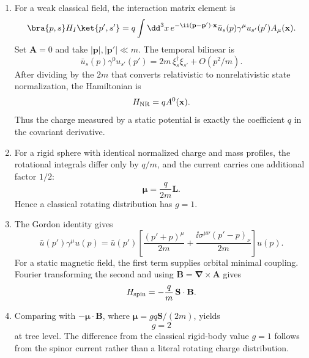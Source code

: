 \begin{enumerate}
\begin{enumerate}
\item
For a weak classical field, the interaction matrix element is
\[
 \bra{p,s}H_I\ket{p',s'}
 =q\int \dd^3x\,e^{-\ii(\mathbf p-\mathbf p')\cdot\mathbf x}
 \bar u_s(p)\gamma^\mu u_{s'}(p')A_\mu(\mathbf x).
\]
Set \(\mathbf A=0\) and take \(|\mathbf p|,|\mathbf p'|\ll m\).
The temporal bilinear is
\[
 \bar u_s(p)\gamma^0u_{s'}(p')
 =2m\,\xi_s^\dagger\xi_{s'}+O(p^2/m).
\]
After dividing by the \(2m\) that converts relativistic to
nonrelativistic state normalization, the Hamiltonian is
\[
 H_{\rm NR}=qA^0(\mathbf x).
\]
Thus the charge measured by a static potential is exactly the coefficient
\(q\) in the covariant derivative.
\item
For a rigid sphere with identical normalized charge and mass profiles,
the rotational integrals differ only by \(q/m\), and the current carries
one additional factor \(1/2\):
\[
 \boldsymbol\mu=\frac{q}{2m}\mathbf L.
\]
Hence a classical rotating distribution has \(g=1\).
\item
The Gordon identity gives
\[
 \bar u(p')\gamma^\mu u(p)
 =\bar u(p')\left[
 \frac{(p'+p)^\mu}{2m}
 +\frac{\ii\sigma^{\mu\nu}(p'-p)_\nu}{2m}
 \right]u(p).
\]
For a static magnetic field, the first term supplies orbital minimal
coupling.  Fourier transforming the second and using
\(\mathbf B=\boldsymbol\nabla\times\mathbf A\) gives
\[
 H_{\rm spin}=-\frac{q}{m}\,\mathbf S\cdot\mathbf B.
\]
\item
Comparing with
\(-\boldsymbol\mu\cdot\mathbf B\), where
\(\boldsymbol\mu=gq\mathbf S/(2m)\), yields
\[
 \boxed{g=2}
\]
at tree level.  The difference from the classical rigid-body value
\(g=1\) follows from the spinor current rather than a literal rotating
charge distribution.
\end{enumerate}


\end{enumerate}
